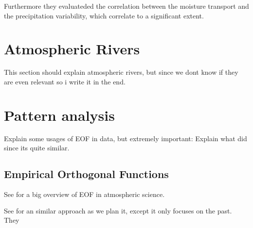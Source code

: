 Furthermore they evaluateded the correlation between the moisture transport and the precipitation variability, which correlate to a significant extent.

\section{Atmospheric Rivers}
\label{sec:atmo-rivers}


This section should explain atmospheric rivers, but since we dont know if they are even relevant so i write it in the end. 

\section{Pattern analysis}

Explain some usages of EOF in data, but extremely important: Explain what \cite{ayantobo_integrated_2022} did since its quite similar. 

\subsection{Empirical Orthogonal Functions}

See \cite{hannachi_empirical_2007} for a big overview of EOF in atmospheric science.

See \cite{ayantobo_integrated_2022} for an similar approach as we plan it, except it only focuses on the past.
They 
